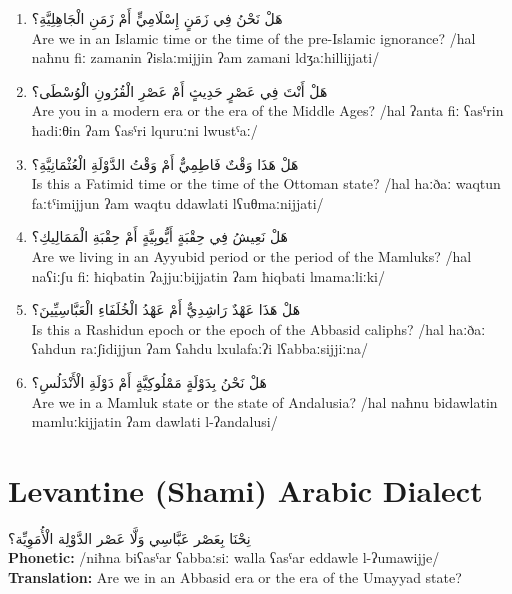 \documentclass[letterpaper,12pt]{article}
\begin{document}
\begin{enumerate}
\item \textarabic{هَلْ نَحْنُ فِي زَمَنٍ إِسْلَامِيٍّ أَمْ زَمَنِ الْجَاهِلِيَّةِ؟}\\
Are we in an Islamic time or the time of the pre-Islamic ignorance? /hal naħnu fiː zamanin ʔislaːmijjin ʔam zamani ldʒaːhillijjati/

\item \textarabic{هَلْ أَنْتَ فِي عَصْرٍ حَدِيثٍ أَمْ عَصْرِ الْقُرُونِ الْوُسْطَى؟}\\
Are you in a modern era or the era of the Middle Ages? /hal ʔanta fiː ʕasˤrin ħadiːθin ʔam ʕasˤri lquruːni lwustˤaː/

\item \textarabic{هَلْ هَذَا وَقْتٌ فَاطِمِيٌّ أَمْ وَقْتُ الدَّوْلَةِ الْعُثْمَانِيَّةِ؟}\\
Is this a Fatimid time or the time of the Ottoman state? /hal haːðaː waqtun faːtˤimijjun ʔam waqtu ddawlati lʕuθmaːnijjati/

\item \textarabic{هَلْ نَعِيشُ فِي حِقْبَةٍ أَيُّوبِيَّةٍ أَمْ حِقْبَةِ الْمَمَالِيكِ؟}\\
Are we living in an Ayyubid period or the period of the Mamluks? /hal naʕiːʃu fiː ħiqbatin ʔajjuːbijjatin ʔam ħiqbati lmamaːliːki/

\item \textarabic{هَلْ هَذَا عَهْدٌ رَاشِدِيٌّ أَمْ عَهْدُ الْخُلَفَاءِ الْعَبَّاسِيِّينَ؟}\\
Is this a Rashidun epoch or the epoch of the Abbasid caliphs? /hal haːðaː ʕahdun raːʃidijjun ʔam ʕahdu lxulafaːʔi lʕabbaːsijjiːna/

\item \textarabic{هَلْ نَحْنُ بِدَوْلَةٍ مَمْلُوكِيَّةٍ أَمْ دَوْلَةِ الْأَنْدَلُسِ؟}\\
Are we in a Mamluk state or the state of Andalusia? /hal naħnu bidawlatin mamluːkijjatin ʔam dawlati l-ʔandalusi/
\end{enumerate}

\section{Levantine (Shami) Arabic Dialect}

\begin{tcolorbox}[colback=white,colframe=dialectcolor,title=\textbf{Levantine Version},breakable]
\textarabic{نِحْنَا بِعَصْر عَبَّاسِي وَلَّا عَصْر الدَّوْلِة الْأُمَوِيِّة؟}\\[0.5em]
\textbf{Phonetic:} /niħna biʕasˤar ʕabbaːsiː walla ʕasˤar eddawle l-ʔumawijje/\\[0.5em]
\textbf{Translation:} Are we in an Abbasid era or the era of the Umayyad state?
\end{tcolorbox}
\end{document}
